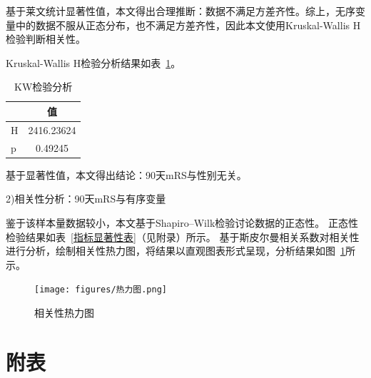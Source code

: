 \documentclass[bwprint]{gmcmthesis}
\begin{document}
基于莱文统计显著性值，本文得出合理推断：数据不满足方差齐性。综上，无序变量中的数据不服从正态分布，也不满足方差齐性，因此本文使用Kruskal-Wallis H检验判断相关性。

Kruskal-Wallis H检验分析结果如表~\ref{KW检验分析}。

\begin{table}[!ht]
    \centering
    \caption{KW检验分析}
    \label{KW检验分析}
    \begin{tabular}{lc}
    \toprule
        $$$$ & 值 \\
    \midrule
        H & 2416.23624 \\
        p & 0.49245 \\
    \bottomrule
    \end{tabular}
\end{table}

基于显著性值，本文得出结论：90天mRS与性别无关。

2)相关性分析：90天mRS与有序变量


鉴于该样本量数据较小，本文基于Shapiro–Wilk检验讨论数据的正态性。
正态性检验结果如表~\ref{指标显著性表}（见附录）所示。
基于斯皮尔曼相关系数对相关性进行分析，绘制相关性热力图，将结果以直观图表形式呈现，分析结果如图~\ref{相关性热力图}所示。

\begin{figure}[h] %
  \centering %
  \texttt{[image: figures/热力图.png]}
  \caption{相关性热力图}
  \label{相关性热力图}
\end{figure}



\newpage






\newpage
\appendix
\section{附表}
\end{document}
